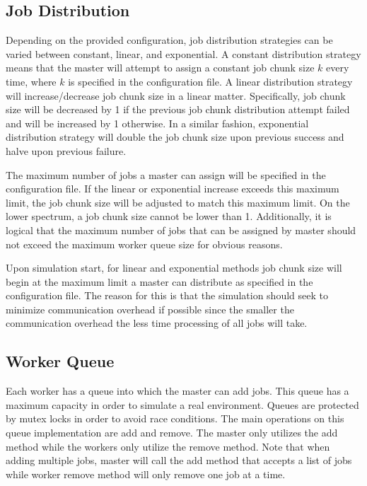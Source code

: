 \documentclass{article}
\begin{document}
\subsection{Job Distribution}
Depending on the provided configuration, job distribution strategies can be varied between constant, linear, and exponential. A constant distribution strategy means that the master will attempt to assign a constant job chunk size $k$ every time, where $k$ is specified in the configuration file. A linear distribution strategy will increase/decrease job chunk size in a linear matter. Specifically, job chunk size will be decreased by 1 if the previous job chunk distribution attempt failed and will be increased by 1 otherwise. In a similar fashion, exponential distribution strategy will double the job chunk size upon previous success and halve upon previous failure. 

The maximum number of jobs a master can assign will be specified in the configuration file. If the linear or exponential increase exceeds this maximum limit, the job chunk size will be adjusted to match this maximum limit. On the lower spectrum, a job chunk size cannot be lower than 1. Additionally, it is logical that the maximum number of jobs that can be assigned by master should not exceed the maximum worker queue size for obvious reasons.

Upon simulation start, for linear and exponential methods job chunk size will begin at the maximum limit a master can distribute as specified in the configuration file. The reason for this is that the simulation should seek to minimize communication overhead if possible since the smaller the communication overhead the less time processing of all jobs will take.

\subsection{Worker Queue}
Each worker has a queue into which the master can add jobs. This queue has a maximum capacity in order to simulate a real environment. Queues are protected by mutex locks in order to avoid race conditions. The main operations on this queue implementation are add and remove. The master only utilizes the add method while the workers only utilize the remove method. Note that when adding multiple jobs, master will call the add method that accepts a list of jobs while worker remove method will only remove one job at a time.
\end{document}

